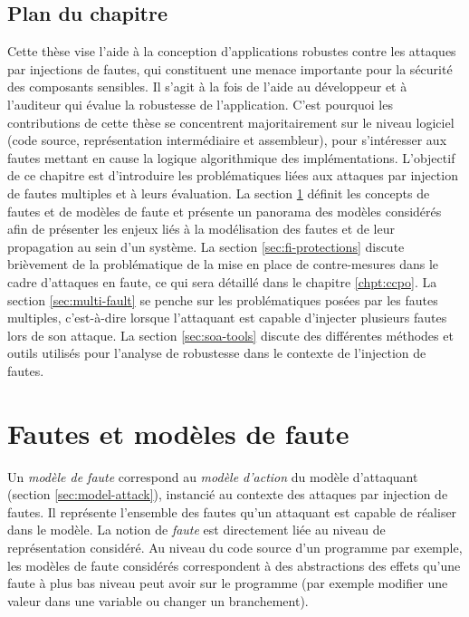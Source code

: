         \subsection{Plan du chapitre}
            
            Cette thèse vise l'aide à la conception d'applications robustes contre les attaques par injections de fautes, qui constituent une menace importante pour la sécurité des composants sensibles.
            Il s'agit à la fois de l'aide au développeur et à l'auditeur qui évalue la robustesse de l'application. C'est pourquoi les contributions de cette thèse se concentrent majoritairement sur le niveau logiciel (code source, représentation intermédiaire et assembleur), pour s'intéresser aux fautes mettant en cause la logique algorithmique des implémentations.
            L'objectif de ce chapitre est d'introduire les problématiques liées aux attaques par injection de fautes multiples et à leurs évaluation.
            La section \ref{sec:models} définit les concepts de fautes et de modèles de faute et présente un panorama des modèles considérés afin de présenter les enjeux liés à la modélisation des fautes et de leur propagation au sein d'un système. 
            La section \ref{sec:fi-protections} discute brièvement de la problématique de la mise en place de contre-mesures dans le cadre d'attaques en faute, ce qui sera détaillé dans le chapitre \ref{chpt:ccpo}.
            La section \ref{sec:multi-fault} se penche sur les problématiques posées par les fautes multiples, c'est-à-dire lorsque l'attaquant est capable d'injecter plusieurs fautes lors de son attaque. 
            La section \ref{sec:soa-tools} discute des différentes méthodes et outils utilisés pour l'analyse de robustesse dans le contexte de l'injection de fautes.
        
    \section{Fautes et modèles de faute}
    \label{sec:models}
    
        Un \textit{modèle de faute} correspond au \textit{modèle d'action} du modèle d'attaquant (section \ref{sec:model-attack}), instancié au contexte des attaques par injection de fautes. Il représente l'ensemble des fautes qu'un attaquant est capable de réaliser dans le modèle.
        La notion de \textit{faute} est directement liée au niveau de représentation considéré. 
        Au niveau du code source d'un programme par exemple, les modèles de faute considérés correspondent à des abstractions des effets qu'une faute à plus bas niveau peut avoir sur le programme (par exemple modifier une valeur dans une variable ou changer un branchement). 
        
